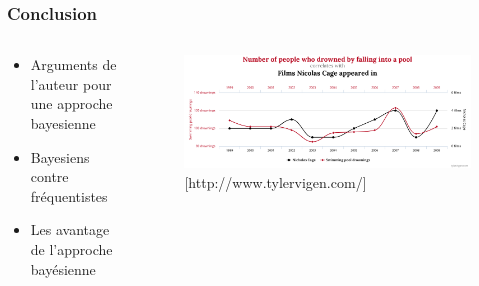 \documentclass{presentation_template}
\begin{document}
\breakingframe{
\begin{textblock*}{13cm}(3.5cm,4cm)
    
\Large \textbf{\textcolor{black}{Conclusion}}
\end{textblock*}
}




\begin{frame}
    \normalsize
    \frametitle{Conclusion}
    \begin{columns}
      \begin{column}{0.5\textwidth}
      
        \begin{itemize}
      
        
          \item Arguments de l'auteur pour une approche bayesienne
          

          \vspace{1cm}
          \item Bayesiens contre fréquentistes
          \vspace{1cm}
          \item Les avantage de l'approche bayésienne
        \end{itemize}

      \end{column}
      \begin{column}{0.5\textwidth}
        \begin{figure}
          \includegraphics[width=\textwidth]{Figures/spurious.png}
          \caption{[http://www.tylervigen.com/]}
      \end{figure}
      \end{column}
      \end{columns}
\end{frame}

\breakingframe{
\begin{textblock*}{13cm}(3.5cm,4cm)
    
\textbf{\textcolor{black}{Merci de votre attention}}
\end{textblock*}
}
\end{document}
